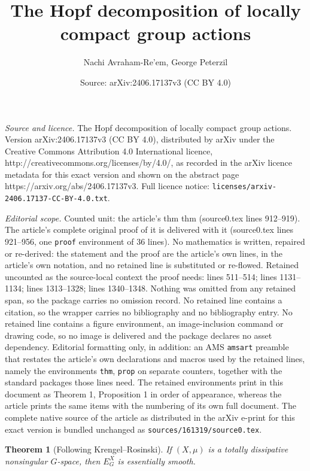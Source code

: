 \documentclass[10pt,a4paper]{amsart}
\title{The Hopf decomposition of locally compact group actions}
\author{Nachi Avraham-Re'em, George Peterzil}
\date{Source: arXiv:2406.17137v3 (CC BY 4.0)}
\newtheorem{thm}{Theorem}
\begin{document}
\maketitle

\noindent\emph{Source and licence.} The Hopf decomposition of locally compact group actions. Version arXiv:2406.17137v3 (CC BY 4.0), distributed by arXiv under the Creative Commons Attribution 4.0 International licence, http://creativecommons.org/licenses/by/4.0/, as recorded in the arXiv licence metadata for this exact version and shown on the abstract page https://arxiv.org/abs/2406.17137v3. Full licence notice: \texttt{licenses/arxiv-2406.17137-CC-BY-4.0.txt}.\par\smallskip

\noindent\textit{Editorial scope.} Counted unit: the article's thm thm (source0.tex lines 912--919). The article's complete original proof of it is delivered with it (source0.tex lines 921--956, one \texttt{proof} environment of 36 lines). No mathematics is written, repaired or re-derived: the statement and the proof are the article's own lines, in the article's own notation, and no retained line is substituted or re-flowed.  Retained uncounted as the source-local context the proof needs: lines 511--514; lines 1131--1134; lines 1313--1328; lines 1340--1348.  Nothing was omitted from any retained span, so the package carries no omission record.  No retained line contains a citation, so the wrapper carries no bibliography and no bibliography entry.  No retained line contains a figure environment, an image-inclusion command or drawing code, so no image is delivered and the package declares no asset dependency.  Editorial formatting only, in addition: an AMS \texttt{amsart} preamble that restates the article's own declarations and macros used by the retained lines, namely the environments \texttt{thm}, \texttt{prop} on separate counters, together with the standard packages those lines need.  The retained environments print in this document as Theorem 1, Proposition 1 in order of appearance, whereas the article prints the same items with the numbering of its own full document.  The complete native source of the article as distributed in the arXiv e-print for this exact version is bundled unchanged as \texttt{sources/161319/source0.tex}.
\begin{thm}[Following Krengel--Rosinski]
\label{thm:disssmooth}
If \(\left(X,\mu\right)\) is a totally dissipative nonsingular \(G\)-space, then \(E_{G}^{X}\) is essentially smooth.
\end{thm}
\end{document}
